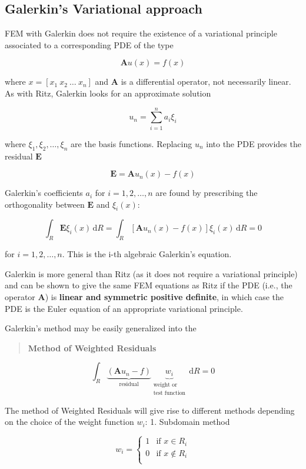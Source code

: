 \documentclass{article}
\begin{document}
\subsection{Galerkin's Variational
approach}\label{galerkins-variational-approach}

FEM with Galerkin does not require the existence of a variational
principle associated to a corresponding PDE of the type

\[
\mathbf{A} u(x) = f(x)
\]

where \(x=[x_1\ x_2\ \ldots\ x_n]\) and \(\mathbf{A}\) is a differential
operator, not necessarily linear. As with Ritz, Galerkin looks for an
approximate solution

\[
u_n = \sum^n_{i=1} a_i \xi_i
\]

where \(\xi_1, \xi_2, \ldots, \xi_n\) are the basis functions. Replacing
\(u_n\) into the PDE provides the residual \(\mathbf{E}\)

\[
\mathbf{E} = \mathbf{A} u_n(x) - f(x)
\]

Galerkin's coefficients \(a_i\) for \(i=1,2,\ldots,n\) are found by
prescribing the orthogonality between \(\mathbf{E}\) and \(\xi_i(x)\):

\[
\int_R \mathbf{E} \xi_i(x) \, \mathrm{d}R = \int_R \left[\mathbf{A} u_n(x) - f(x)\right] \xi_i(x) \, \mathrm{d}R = 0
\]

for \(i=1,2,\ldots,n\). This is the i-th algebraic Galerkin's equation.

Galerkin is more general than Ritz (as it does not require a variational
principle) and can be shown to give the same FEM equations as Ritz if
the PDE (i.e., the operator \(\mathbf{A}\)) is \textbf{linear and
symmetric positive definite}, in which case the PDE is the Euler
equation of an appropriate variational principle.

Galerkin's method may be easily generalized into the

\begin{quote}
\textbf{Method of Weighted Residuals}
\end{quote}

\[
\int_R \underbrace{\left(\mathbf{A} u_n - f \right)}_\text{residual} \underbrace{w_i}_{\substack{\text{weight or}\\\text{test function}}} \, \mathrm{d}R = 0
\]

The method of Weighted Residuals will give rise to different methods
depending on the choice of the weight function \(w_i\): 1. Subdomain
method

\[
   w_i=
   \begin{cases}
      1 & \text{if } x \in R_i \\
      0 & \text{if } x \notin R_i \\
   \end{cases}
   \]
\end{document}
